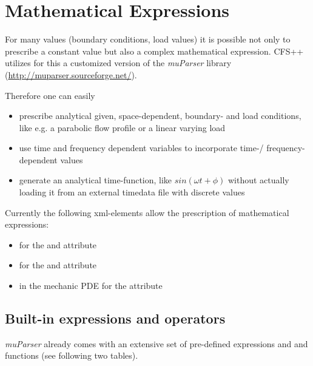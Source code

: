 \chapter{Mathematical Expressions} \label{chap:MathExpr}
For many values (boundary conditions, load values) it is possible not
only to prescribe a constant value but also a complex mathematical
expression. CFS++ utilizes for this a customized version of the {\em
  muParser} library (\url{http://muparser.sourceforge.net/}).

\noindent
Therefore one can easily
\begin{itemize}
\item prescribe analytical given, space-dependent, boundary- and load
  conditions, like e.g. a parabolic flow profile or a linear varying load
\item use time and frequency dependent variables to incorporate time-/
  frequency-dependent values
\item generate an analytical time-function, like $sin(\omega t
  + \phi)$ without actually loading it from an external timedata file
  with discrete values
\end{itemize}

\noindent
Currently the following xml-elements allow the prescription of mathematical
expressions:
\begin{itemize}
\item {} for the  and
 attribute
\item {} for the  and 
attribute
\item {} in the mechanic PDE for the attribute
\end{itemize}

\section{Built-in expressions and operators}
{\em muParser} already comes with an extensive set of pre-defined
expressions and and functions (see following two tables).

